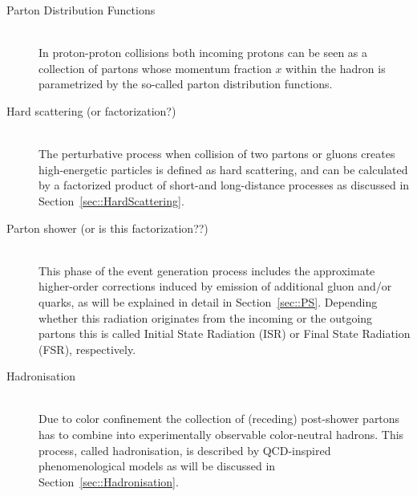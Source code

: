 \begin{myindentpar}
  \begin{description}
    \item[Parton Distribution Functions] \hfill \\
      In proton-proton collisions both incoming protons can be seen as a collection of partons whose momentum fraction $x$ within the hadron is parametrized by the so-called parton distribution functions.
    \item[Hard scattering (or factorization?)] \hfill \\
      The perturbative process when collision of two partons or gluons creates high-energetic particles is defined as hard scattering, and can be calculated by a factorized product of short-and long-distance processes as discussed in Section~\ref{sec::HardScattering}.
    \item[Parton shower (or is this factorization??)] \hfill \\
      This phase of the event generation process includes the approximate higher-order corrections induced by emission of additional gluon and/or quarks, as will be explained in detail in Section~\ref{sec::PS}. Depending whether this radiation originates from the incoming or the outgoing partons this is called Initial State Radiation (ISR) or Final State Radiation (FSR), respectively.
    \item[Hadronisation] \hfill \\
      Due to color confinement the collection of (receding) post-shower partons has to combine into experimentally observable color-neutral hadrons. This process, called hadronisation, is described by QCD-inspired phenomenological models as will be discussed in Section~\ref{sec::Hadronisation}.
  \end{description}
\end{myindentpar}

